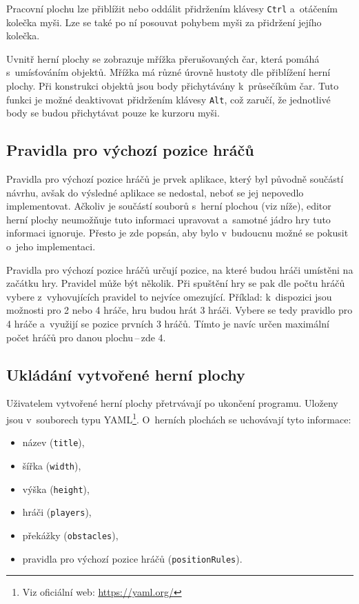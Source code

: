 Pracovní plochu lze přiblížit nebo oddálit přidržením klávesy \texttt{Ctrl} a~otáčením kolečka myši. Lze se také po ní posouvat pohybem myši za přidržení jejího kolečka.

Uvnitř herní plochy se zobrazuje mřížka přerušovaných čar, která pomáhá s~umísťováním objektů. Mřížka má různé úrovně hustoty dle přiblížení herní plochy. Při konstrukci objektů jsou body přichytávány k~průsečíkům čar. Tuto funkci je možné deaktivovat přidržením klávesy \texttt{Alt}, což zaručí, že jednotlivé body se budou přichytávat pouze ke kurzoru myši.

\subsection*{Pravidla pro výchozí pozice hráčů}

Pravidla pro výchozí pozice hráčů je prvek aplikace, který byl původně součástí návrhu, avšak do výsledné aplikace se nedostal, neboť se jej nepovedlo implementovat. Ačkoliv je součástí souborů s~herní plochou (viz níže), editor herní plochy neumožňuje tuto informaci upravovat a~samotné jádro hry tuto informaci ignoruje. Přesto je zde popsán, aby bylo v~budoucnu možné se pokusit o~jeho implementaci.

Pravidla pro výchozí pozice hráčů určují pozice, na které budou hráči umístěni na začátku hry. Pravidel může být několik. Při spuštění hry se pak dle počtu hráčů vybere z~vyhovujících pravidel to nejvíce omezující. Příklad: k~dispozici jsou možnosti pro 2 nebo 4 hráče, hru budou hrát 3 hráči. Vybere se tedy pravidlo pro 4 hráče a~využijí se pozice prvních 3 hráčů. Tímto je navíc určen maximální počet hráčů pro danou plochu\,--\,zde 4.

\subsection*{Ukládání vytvořené herní plochy}

Uživatelem vytvořené herní plochy přetrvávají po ukončení programu. Uloženy jsou v~souborech typu YAML\footnote{Viz oficiální web: \url{https://yaml.org/}}. O~herních plochách se uchovávají tyto informace:

\begin{itemize}
    \item název (\texttt{title}),
    \item šířka (\texttt{width}),
    \item výška (\texttt{height}),
    \item hráči (\texttt{players}),
    \item překážky (\texttt{obstacles}),
    \item pravidla pro výchozí pozice hráčů (\texttt{positionRules}).
\end{itemize}

